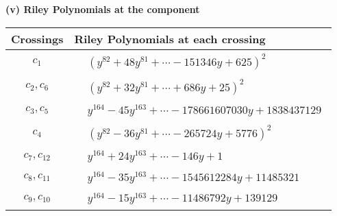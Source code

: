 \documentclass[1p]{elsarticle_modified}
\theoremstyle{definition}
\begin{document}
\newpage\renewcommand{\arraystretch}{1}
\flushleft \textbf{(v) Riley Polynomials at the component}\newline \\
\begin{tabular}{m{50pt}|m{274pt}}
Crossings & \hspace{64pt}Riley Polynomials at each crossing \\
\hline $$\begin{aligned}c_{1}\end{aligned}$$&$\begin{aligned}
&(y^{82}+48 y^{81}+\cdots-151346 y+625)^{2}
\end{aligned}$\\
\hline $$\begin{aligned}c_{2},c_{6}\end{aligned}$$&$\begin{aligned}
&(y^{82}+32 y^{81}+\cdots+686 y+25)^{2}
\end{aligned}$\\
\hline $$\begin{aligned}c_{3},c_{5}\end{aligned}$$&$\begin{aligned}
&y^{164}-45 y^{163}+\cdots-178661607030 y+1838437129
\end{aligned}$\\
\hline $$\begin{aligned}c_{4}\end{aligned}$$&$\begin{aligned}
&(y^{82}-36 y^{81}+\cdots-265724 y+5776)^{2}
\end{aligned}$\\
\hline $$\begin{aligned}c_{7},c_{12}\end{aligned}$$&$\begin{aligned}
&y^{164}+24 y^{163}+\cdots-146 y+1
\end{aligned}$\\
\hline $$\begin{aligned}c_{8},c_{11}\end{aligned}$$&$\begin{aligned}
&y^{164}-35 y^{163}+\cdots-1545612284 y+11485321
\end{aligned}$\\
\hline $$\begin{aligned}c_{9},c_{10}\end{aligned}$$&$\begin{aligned}
&y^{164}-15 y^{163}+\cdots-11486792 y+139129
\end{aligned}$\\
\hline
\end{tabular}\\~\\
\end{document}
